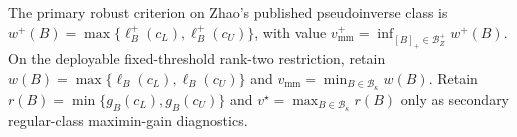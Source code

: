 The primary robust criterion on Zhao's published pseudoinverse class is \(w^+(B)=\max\{\ell_B^+(c_L),\ell_B^+(c_U)\}\), with value \(v_{\mathrm{mm}}^+=\inf_{[B]_+\in\mathcal B_Z^+}w^+(B)\).  On the deployable fixed-threshold rank-two restriction, retain \(w(B)=\max\{\ell_B(c_L),\ell_B(c_U)\}\) and \(v_{\mathrm{mm}}=\min_{B\in\mathcal B_\kappa}w(B)\).  Retain \(r(B)=\min\{g_B(c_L),g_B(c_U)\}\) and \(v^\star=\max_{B\in\mathcal B_\kappa}r(B)\) only as secondary regular-class maximin-gain diagnostics.